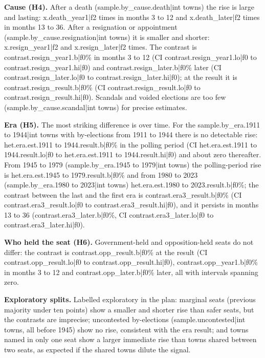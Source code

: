 \documentclass[11pt,a4paper]{article}
\begin{document}
\textbf{Cause (H4).} After a death ({{sample.by_cause.death|int}} towns) the rise is large and lasting: {{x.death_year1|f2}} times in months 3 to 12 and {{x.death_later|f2}} times in months 13 to 36. After a resignation or appointment ({{sample.by_cause.resignation|int}} towns) it is smaller and shorter: {{x.resign_year1|f2}} and {{x.resign_later|f2}} times. The contrast is {{contrast.resign_year1.b|f0}}\% in months 3 to 12 (CI {{contrast.resign_year1.lo|f0}} to {{contrast.resign_year1.hi|f0}}) and {{contrast.resign_later.b|f0}}\% later (CI {{contrast.resign_later.lo|f0}} to {{contrast.resign_later.hi|f0}}); at the result it is {{contrast.resign_result.b|f0}}\% (CI {{contrast.resign_result.lo|f0}} to {{contrast.resign_result.hi|f0}}). Scandals and voided elections are too few ({{sample.by_cause.scandal|int}} towns) for precise estimates.

\textbf{Era (H5).} The most striking difference is over time. For the {{sample.by_era.1911 to 1944|int}} towns with by-elections from 1911 to 1944 there is no detectable rise: {{het.era.est.1911 to 1944.result.b|f0}}\% in the polling period (CI {{het.era.est.1911 to 1944.result.lo|f0}} to {{het.era.est.1911 to 1944.result.hi|f0}}) and about zero thereafter. From 1945 to 1979 ({{sample.by_era.1945 to 1979|int}} towns) the polling-period rise is {{het.era.est.1945 to 1979.result.b|f0}}\% and from 1980 to 2023 ({{sample.by_era.1980 to 2023|int}} towns) {{het.era.est.1980 to 2023.result.b|f0}}\%; the contrast between the last and the first era is {{contrast.era3_result.b|f0}}\% (CI {{contrast.era3_result.lo|f0}} to {{contrast.era3_result.hi|f0}}), and it persists in months 13 to 36 ({{contrast.era3_later.b|f0}}\%, CI {{contrast.era3_later.lo|f0}} to {{contrast.era3_later.hi|f0}}).

\textbf{Who held the seat (H6).} Government-held and opposition-held seats do not differ: the contrast is {{contrast.opp_result.b|f0}}\% at the result (CI {{contrast.opp_result.lo|f0}} to {{contrast.opp_result.hi|f0}}), {{contrast.opp_year1.b|f0}}\% in months 3 to 12 and {{contrast.opp_later.b|f0}}\% later, all with intervals spanning zero.

\textbf{Exploratory splits.} Labelled exploratory in the plan: marginal seats (previous majority under ten points) show a smaller and shorter rise than safer seats, but the contrasts are imprecise; uncontested by-elections ({{sample.uncontested|int}} towns, all before 1945) show no rise, consistent with the era result; and towns named in only one seat show a larger immediate rise than towns shared between two seats, as expected if the shared towns dilute the signal.
\end{document}
